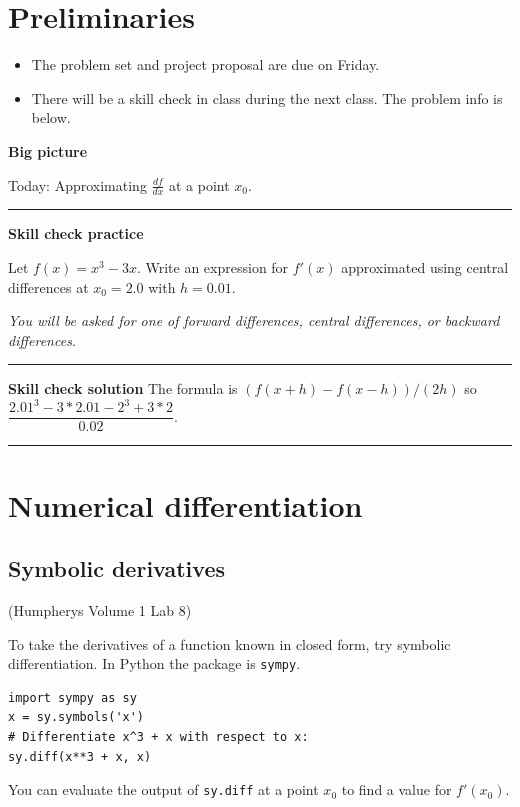 \documentclass[12pt,letterpaper,noanswers]{exam}
\begin{document}
 \pdfpageheight 11in 
  \pdfpagewidth 8.5in

\noindent 

\section*{Preliminaries}

\begin{itemize}
\itemsep0pt
\item The problem set and project proposal are due on Friday.
\item There will be a skill check in class during the next class.  The problem info is below.
\end{itemize}


\noindent\textbf{Big picture}

Today: Approximating $\frac{df}{dx}$ at a point $x_0$.

\vspace{0.2cm}
\hrule
\vspace{0.2cm}

\noindent \textbf{Skill check practice}

Let $f(x) = x^3 - 3x$.  Write an expression for $f'(x)$ approximated using central differences at $x_0 = 2.0$ with $h = 0.01$.

\emph{You will be asked for one of forward differences, central differences, or backward differences.}


\vspace{0.2cm}
\hrule
\vspace{0.2cm}

\noindent \textbf{Skill check solution}
 The formula is $(f(x+h) - f(x-h))/(2h)$ so $\dfrac{2.01^3-3*2.01 - 2^3+3*2}{0.02}$.


\vspace{0.2cm}
\hrule
\vspace{0.2cm}



\section*{Numerical differentiation}




\subsection*{Symbolic derivatives}
\begin{tcolorbox}

(Humpherys Volume 1 Lab 8)

To take the derivatives of a function known in closed form, try symbolic differentiation.  In Python the package is \texttt{sympy}.
\begin{verbatim}
import sympy as sy
x = sy.symbols('x')
# Differentiate x^3 + x with respect to x:
sy.diff(x**3 + x, x)
\end{verbatim}

You can evaluate the output of \texttt{sy.diff} at a point $x_0$ to find a value for $f'(x_0)$.
\end{tcolorbox}
\end{document}
